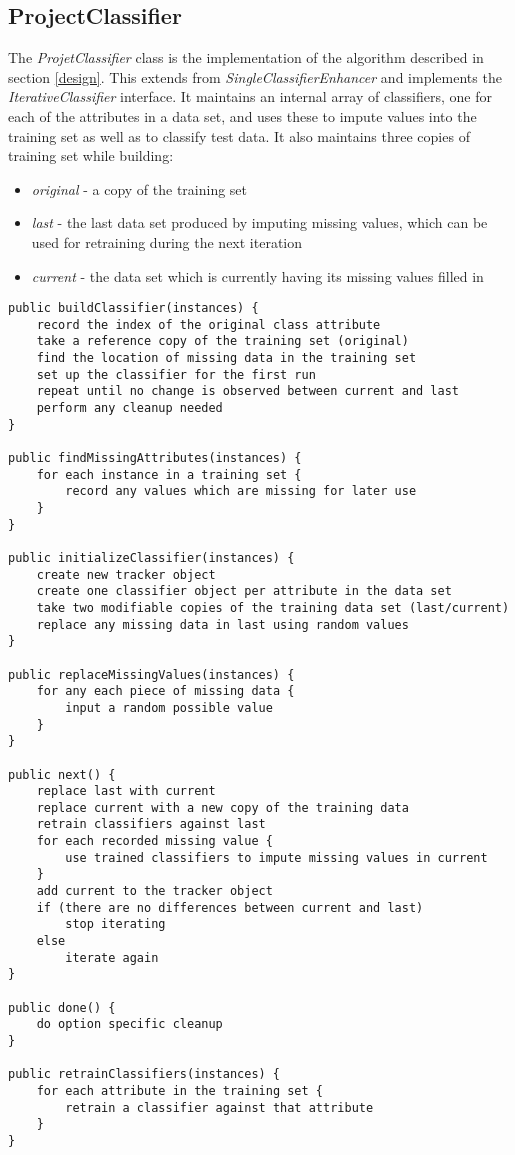 \subsection{ProjectClassifier}
The \textit{ProjetClassifier} class is the implementation of the algorithm described in section \ref{design}. This extends from \textit{SingleClassifierEnhancer} and implements the \textit{IterativeClassifier} interface. It maintains an internal array of classifiers, one for each of the attributes in a data set, and uses these to impute values into the training set as well as to classify test data. It also maintains three copies of training set while building:

\begin{itemize}
\item \textit{original} - a copy of the training set
\item \textit{last} - the last data set produced by imputing missing values, which can be used for retraining during the next iteration
\item \textit{current} - the data set which is currently having its missing values filled in
\end{itemize}

\begin{footnotesize}
\begin{verbatim}
public buildClassifier(instances) {
    record the index of the original class attribute
    take a reference copy of the training set (original)
    find the location of missing data in the training set
    set up the classifier for the first run
    repeat until no change is observed between current and last
    perform any cleanup needed
}

public findMissingAttributes(instances) {
    for each instance in a training set {
        record any values which are missing for later use
    }
}

public initializeClassifier(instances) {
    create new tracker object
    create one classifier object per attribute in the data set
    take two modifiable copies of the training data set (last/current)
    replace any missing data in last using random values
}

public replaceMissingValues(instances) {
    for any each piece of missing data {
        input a random possible value
    }
}

public next() {
    replace last with current
    replace current with a new copy of the training data
    retrain classifiers against last
    for each recorded missing value {
        use trained classifiers to impute missing values in current
    }
    add current to the tracker object
    if (there are no differences between current and last)
        stop iterating
    else   
        iterate again
}

public done() {
    do option specific cleanup
}

public retrainClassifiers(instances) {
    for each attribute in the training set {
        retrain a classifier against that attribute
    }
}
\end{verbatim}
\end{footnotesize}

